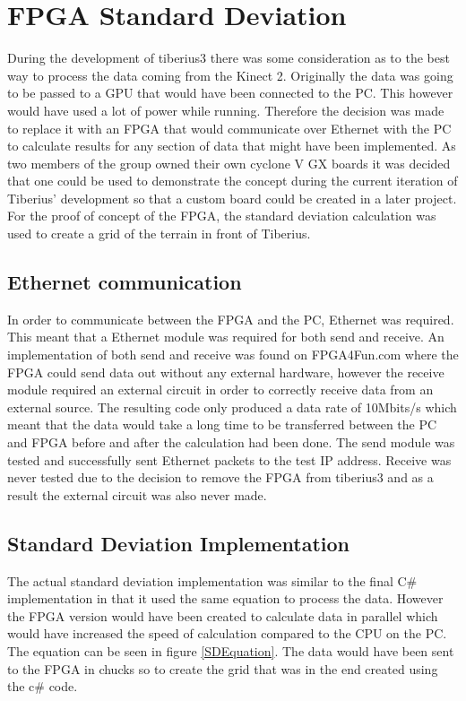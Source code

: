 \section{FPGA Standard Deviation}
During the development of \gls{tiberius3} there was some consideration as to the best way to process the data coming from the Kinect 2. Originally the data was going to be passed to a GPU that would have been connected to the PC. This however would have used a lot of power while running. Therefore the decision was made to replace it with an \gls{FPGA} that would communicate over Ethernet with the PC to calculate results for any section of data that might have been implemented. As two members of the group owned their own cyclone V GX boards \cite{CycloneV} it was decided that one could be used to demonstrate the concept during the current iteration of Tiberius' development so that a custom board could be created in a later project. For the proof of concept of the \gls{FPGA}, the standard deviation calculation was used to create a grid of the terrain in front of Tiberius.
\subsection{Ethernet communication}
In order to communicate between the \gls{FPGA} and the PC, Ethernet was required. This meant that a Ethernet module was required for both send and receive. An implementation of both send and receive was found on FPGA4Fun.com \cite{FPGA4Fun} where the \gls{FPGA} could send data out without any external hardware, however the receive module required an external circuit in order to correctly receive data from an external source. The resulting code only produced a data rate of 10Mbits/s which meant that the data would take a long time to be transferred between the PC and \gls{FPGA} before and after the calculation had been done. The send module was tested and successfully sent Ethernet packets to the test IP address. Receive was never tested due to the decision to remove the \gls{FPGA} from \gls{tiberius3} and as a result the external circuit was also never made.
\subsection{Standard Deviation Implementation}
The actual standard deviation implementation was similar to the final C\# implementation in that it used the same equation to process the data. However the \gls{FPGA} version would have been created to calculate data in parallel which would have increased the speed of calculation compared to the CPU on the PC. The equation can be seen in figure \ref{SDEquation}. The data would have been sent to the \gls{FPGA} in chucks so to create the grid that was in the end created using the c\# code.
